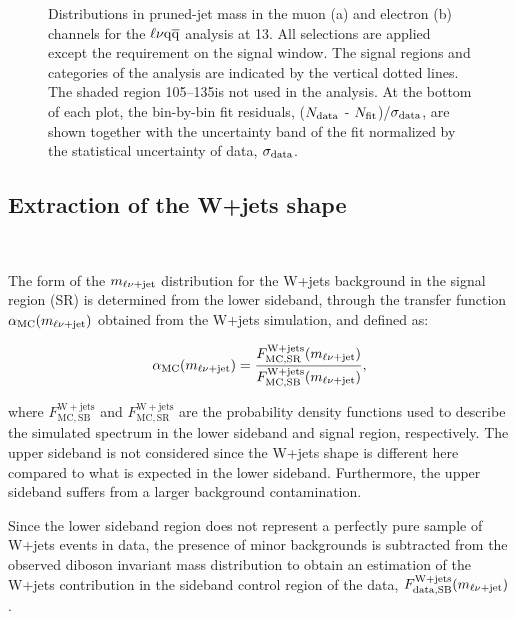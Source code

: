 \begin{figure}[!htb]
\centering     %
{}
\caption{Distributions in pruned-jet mass in the muon (a) and electron (b) channels for the $\ell\nu\mathrm{q}\overline{\mathrm{q}}$ analysis at 13\TeV. All selections are applied except the requirement on the \mJ signal window. The signal regions and \mJ categories of the analysis are indicated by the vertical dotted lines. The shaded \mJ region 105--135\GeV is not used in the analysis. At the bottom of each plot, the bin-by-bin fit residuals, ($N_{\rm data}$ - $N_{\rm fit}$)/$\sigma_{\rm data}$, are shown together with the uncertainty band of the fit normalized by the statistical uncertainty of data, $\sigma_{\rm data}$.}
\label{fig:mjfit13TeV}
\end{figure}

\subsection{Extraction of the W+jets shape}~\label{subsec:wjetshape}

The form of the $m_{\ell\nu+{\rm jet}}$ distribution for the W+jets background in the signal region (SR) is determined from the lower \mJ sideband, through the transfer function $\alpha_\mathrm{MC}(m_{\ell\nu+{\rm jet}})$ obtained from the W+jets simulation, and defined as:

\begin{equation}
\alpha_\mathrm{MC}(m_{\ell\nu+{\rm jet}}) = \frac{F_\mathrm{MC, SR}^{\mathrm{W+jets}}(m_{\ell\nu+{\rm jet}})}{F_\mathrm{MC, SB}^{\mathrm{W+jets}}(m_{\ell\nu+{\rm jet}})},
\end{equation}

where $F_\mathrm{MC, SB}^{\mathrm{W+jets}}$ and $F_\mathrm{MC, SR}^{\mathrm{W+jets}}$ are the probability density functions used to describe the simulated \mlvj spectrum in the lower \mJ sideband and signal region, respectively.
The upper \mJ sideband is not considered since the W+jets shape is different here compared to what is expected in the lower sideband. Furthermore, the upper sideband suffers from a larger \ttbar background contamination.

Since the lower sideband region does not represent a perfectly pure sample of W+jets events in data, the presence of minor backgrounds is subtracted from the observed diboson invariant mass distribution
to obtain an estimation of the W+jets contribution in the sideband control region of the data, $F_\mathrm{data, SB}^{\mathrm{W+jets}}(m_{\ell\nu+{\rm jet}})$.

